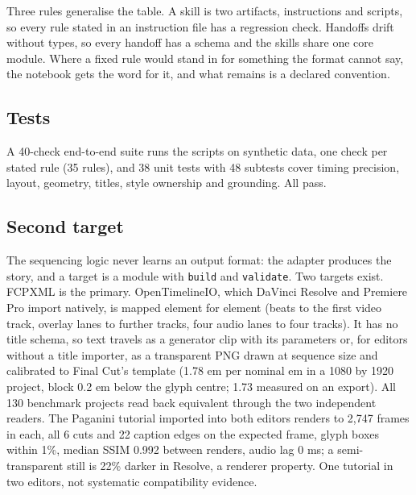\documentclass{ceurart}
\begin{document}
Three rules generalise the table. A skill is two artifacts, instructions
and scripts, so every rule stated in an instruction file has a
regression check. Handoffs drift without types, so every handoff has a
schema and the skills share one core module. Where a fixed rule would
stand in for something the format cannot say, the notebook gets the word
for it, and what remains is a declared convention.

\subsection{Tests}\label{tests}

A 40-check end-to-end suite runs the scripts on synthetic data, one
check per stated rule (35 rules), and 38 unit tests with 48 subtests
cover timing precision, layout, geometry, titles, style ownership and
grounding. All pass.

\subsection{Second target}\label{second-target}

The sequencing logic never learns an output format: the adapter produces
the story, and a target is a module with \texttt{build} and
\texttt{validate}. Two targets exist. FCPXML is the primary.
OpenTimelineIO, which DaVinci Resolve and Premiere Pro import natively,
is mapped element for element (beats to the first video track, overlay
lanes to further tracks, four audio lanes to four tracks). It has no
title schema, so text travels as a generator clip with its parameters
or, for editors without a title importer, as a transparent PNG drawn at
sequence size and calibrated to Final Cut's template (1.78 em per
nominal em in a 1080 by 1920 project, block 0.2 em below the glyph
centre; 1.73 measured on an export). All 130 benchmark projects read
back equivalent through the two independent readers. The Paganini
tutorial imported into both editors renders to 2,747 frames in each, all
6 cuts and 22 caption edges on the expected frame, glyph boxes within
1\%, median SSIM 0.992 between renders, audio lag 0 ms; a
semi-transparent still is 22\% darker in Resolve, a renderer property.
One tutorial in two editors, not systematic compatibility evidence.
\end{document}
